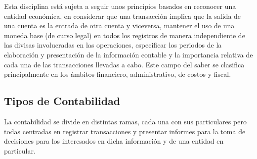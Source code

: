 \documentclass[letterpaper, 12pt]{article}
\begin{document}
			Esta disciplina está sujeta a seguir unos principios basados en reconocer una entidad económica, en considerar que una transacción implica que la salida de una cuenta es la entrada de otra cuenta y viceversa, mantener el uso de una moneda base (de curso legal) en todos los registros de manera independiente de las divisas involucradas en las operaciones, especificar los periodos de la elaboración y presentación de la información contable y la importancia relativa de cada una de las transacciones llevadas a cabo. Este campo del saber se clasifica principalmente en los ámbitos financiero, administrativo, de costos y fiscal.
	
	\subsection*{Tipos de Contabilidad}

			La contabilidad se divide en distintas ramas, cada una con sus particulares pero todas centradas en registrar transacciones y presentar informes para la toma de decisiones para los interesados en dicha información y de una entidad en particular.
\end{document}

